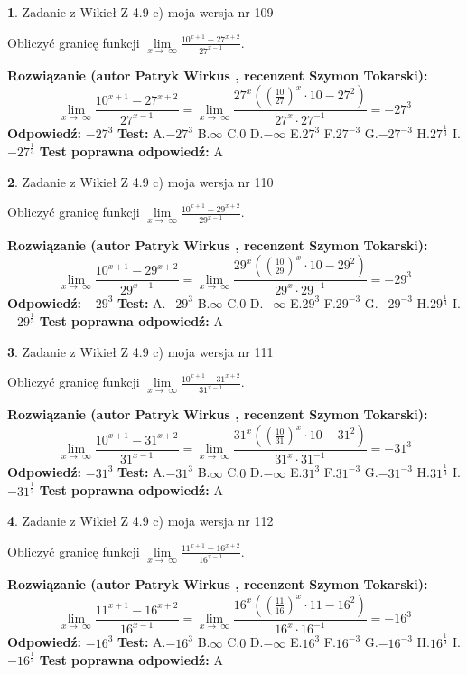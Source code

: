 \documentclass[12pt, a4paper]{article}
\theoremstyle{definition} %
\newtheorem{zad}{}
\newcommand{\zadStart}[1]{\begin{zad}#1\newline}
\newcommand{\zadStop}{\end{zad}}
\newcommand{\rozwStart}[2]{\noindent \textbf{Rozwiązanie (autor #1 , recenzent #2): }\newline}
\newcommand{\rozwStop}{\newline}
\newcommand{\odpStart}{\noindent \textbf{Odpowiedź:}\newline}
\newcommand{\odpStop}{\newline}
\newcommand{\testStart}{\noindent \textbf{Test:}\newline}
\newcommand{\testStop}{\newline}
\newcommand{\kluczStart}{\noindent \textbf{Test poprawna odpowiedź:}\newline}
\newcommand{\kluczStop}{\newline}
\begin{document}
\zadStart{Zadanie z Wikieł Z 4.9 c) moja wersja nr 109}


Obliczyć granicę funkcji  $\lim\limits_{x\to\ \infty}\frac{10^{x+1}-27^{x+2}}{27^{x-1}}$.
\zadStop
\rozwStart{Patryk Wirkus}{Szymon Tokarski}
$$\lim\limits_{x\to\ \infty}\frac{10^{x+1}-27^{x+2}}{27^{x-1}}=\lim\limits_{x\to\ \infty}\frac{27^{x}((\frac{10}{27})^{x}\cdot 10 -27^{2})}{27^{x}\cdot 27^{-1}} = -27^{3}$$
\rozwStop
\odpStart
$-27^{3}$
\odpStop
\testStart
A.$-27^{3}$ B.$\infty$ C.$0$ D.$-\infty$ E.$27^{3}$
F.$27^{-3}$ G.$-27^{-3}$
H.$27^{\frac{1}{3}}$
I.$-27^{\frac{1}{3}}$
\testStop
\kluczStart
A
\kluczStop



\zadStart{Zadanie z Wikieł Z 4.9 c) moja wersja nr 110}


Obliczyć granicę funkcji  $\lim\limits_{x\to\ \infty}\frac{10^{x+1}-29^{x+2}}{29^{x-1}}$.
\zadStop
\rozwStart{Patryk Wirkus}{Szymon Tokarski}
$$\lim\limits_{x\to\ \infty}\frac{10^{x+1}-29^{x+2}}{29^{x-1}}=\lim\limits_{x\to\ \infty}\frac{29^{x}((\frac{10}{29})^{x}\cdot 10 -29^{2})}{29^{x}\cdot 29^{-1}} = -29^{3}$$
\rozwStop
\odpStart
$-29^{3}$
\odpStop
\testStart
A.$-29^{3}$ B.$\infty$ C.$0$ D.$-\infty$ E.$29^{3}$
F.$29^{-3}$ G.$-29^{-3}$
H.$29^{\frac{1}{3}}$
I.$-29^{\frac{1}{3}}$
\testStop
\kluczStart
A
\kluczStop



\zadStart{Zadanie z Wikieł Z 4.9 c) moja wersja nr 111}


Obliczyć granicę funkcji  $\lim\limits_{x\to\ \infty}\frac{10^{x+1}-31^{x+2}}{31^{x-1}}$.
\zadStop
\rozwStart{Patryk Wirkus}{Szymon Tokarski}
$$\lim\limits_{x\to\ \infty}\frac{10^{x+1}-31^{x+2}}{31^{x-1}}=\lim\limits_{x\to\ \infty}\frac{31^{x}((\frac{10}{31})^{x}\cdot 10 -31^{2})}{31^{x}\cdot 31^{-1}} = -31^{3}$$
\rozwStop
\odpStart
$-31^{3}$
\odpStop
\testStart
A.$-31^{3}$ B.$\infty$ C.$0$ D.$-\infty$ E.$31^{3}$
F.$31^{-3}$ G.$-31^{-3}$
H.$31^{\frac{1}{3}}$
I.$-31^{\frac{1}{3}}$
\testStop
\kluczStart
A
\kluczStop



\zadStart{Zadanie z Wikieł Z 4.9 c) moja wersja nr 112}


Obliczyć granicę funkcji  $\lim\limits_{x\to\ \infty}\frac{11^{x+1}-16^{x+2}}{16^{x-1}}$.
\zadStop
\rozwStart{Patryk Wirkus}{Szymon Tokarski}
$$\lim\limits_{x\to\ \infty}\frac{11^{x+1}-16^{x+2}}{16^{x-1}}=\lim\limits_{x\to\ \infty}\frac{16^{x}((\frac{11}{16})^{x}\cdot 11 -16^{2})}{16^{x}\cdot 16^{-1}} = -16^{3}$$
\rozwStop
\odpStart
$-16^{3}$
\odpStop
\testStart
A.$-16^{3}$ B.$\infty$ C.$0$ D.$-\infty$ E.$16^{3}$
F.$16^{-3}$ G.$-16^{-3}$
H.$16^{\frac{1}{3}}$
I.$-16^{\frac{1}{3}}$
\testStop
\kluczStart
A
\kluczStop
\end{document}
